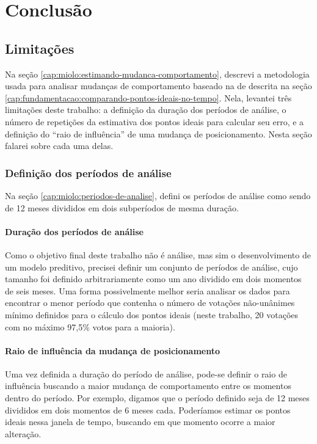 \chapter{Conclusão}\label{cap:conclusao}

\section{Limitações}
\label{cap:conclusao:limitacoes}

Na seção \ref{cap:miolo:estimando-mudanca-comportamento}, descrevi a metodologia usada
para analisar mudanças de comportamento baseado na de 
descrita na seção \ref{cap:fundamentacao:comparando-pontos-ideais-no-tempo}.
Nela, levantei três limitações deste trabalho: a definição da duração dos
períodos de análise, o número de repetições da estimativa dos pontos ideais para
calcular seu erro, e a definição do ``raio de influência'' de uma mudança de
posicionamento. Nesta seção falarei sobre cada uma delas.

\subsection{Definição dos períodos de análise}

Na seção \ref{cap:miolo:periodos-de-analise}, defini os períodos de análise
como sendo de 12 meses divididos em dois subperíodos de mesma duração.

\subsubsection*{Duração dos períodos de análise}

Como o objetivo final deste trabalho não é análise, mas sim o desenvolvimento
de um modelo preditivo, precisei definir um conjunto de períodos de análise,
cujo tamanho foi definido arbitrariamente como um ano dividido em dois momentos
de seis meses. Uma forma possivelmente melhor seria analisar os dados para
encontrar o menor período que contenha o número de votações não-unânimes mínimo
definidos para o cálculo dos pontos ideais (neste trabalho, 20 votações com no
máximo 97,5\% votos para a maioria).

\subsubsection*{Raio de influência da mudança de posicionamento}

Uma vez definida a duração do período de análise, pode-se definir o raio de
influência buscando a maior mudança de comportamento entre os momentos dentro
do período. Por exemplo, digamos que o período definido seja de 12 meses
divididos em dois momentos de 6 meses cada. Poderíamos estimar os pontos ideais
nessa janela de tempo, buscando em que momento ocorre a maior alteração.
